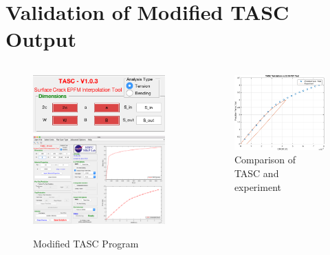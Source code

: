 \section{Validation of Modified TASC Output}

\begin{frame}
\begin{columns}
\begin{column}{0.45\textwidth}
\begin{figure}[tbp]
\centering
\includegraphics[width=0.8\columnwidth]{tasc-modified-ui} \vspace{1ex}
\includegraphics[width=0.8\columnwidth]{tasc-force-cmod-validation}
\caption{Modified TASC Program}
\end{figure}
\end{column}
\begin{column}{0.45\textwidth}
\begin{figure}[tbp]
\centering
\includegraphics[width=0.75\columnwidth]{experimental-validation}
\caption{Comparison of TASC and experiment}
\end{figure}
\end{column}
\end{columns}
\note{
\vfill
}
\end{frame}

